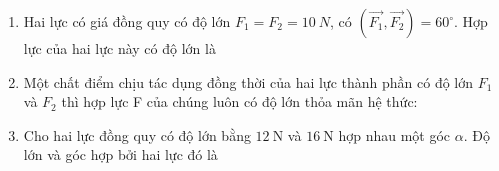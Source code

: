 \begin{enumerate}[label=\bfseries Câu \arabic*:]
{		Hai lực cân bằng đặt vào cùng một vật.
		
	}
	
	\item {}
	
	{ Hai lực có giá đồng quy có độ lớn $F_1=F_2=10\ N$, có $(\overrightarrow {F_1}, \overrightarrow {F_2})=60^\circ$. Hợp lực của hai lực này có độ lớn là
		
	}
	\item {}
	
	{ Một chất điểm chịu tác dụng đồng thời của hai lực thành phần có độ lớn $F_1$ và $F_2$ thì hợp lực F của chúng luôn có độ lớn thỏa mãn hệ thức:
		
	}
	\item {}
	
	{ Cho hai lực đồng quy có độ lớn bằng $12\ \text{N}$ và $16\ \text{N}$ hợp nhau một góc $\alpha$. Độ lớn và góc hợp bởi hai lực đó là 
	}
\end{enumerate}
